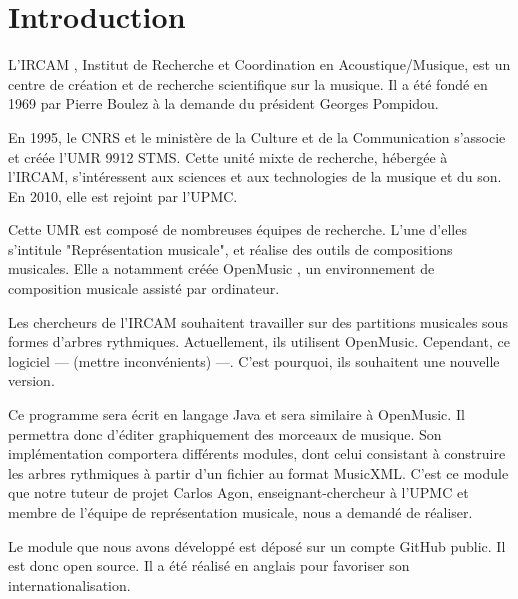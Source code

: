 \section{Introduction}


L'IRCAM \cite{ircam}, Institut de Recherche et Coordination en Acoustique/Musique, est un centre de création et de recherche scientifique sur la musique. Il a été fondé en 1969 par Pierre Boulez à la demande du président Georges Pompidou. 

\par
En 1995, le CNRS et le ministère de la Culture et de la Communication s'associe et créée l'UMR 9912 STMS. Cette unité mixte de recherche, hébergée à l'IRCAM, s'intéressent aux sciences et aux technologies de la musique et du son. En 2010, elle est rejoint par l'UPMC.

\par
Cette UMR est composé de nombreuses équipes de recherche. L'une d'elles s'intitule "Représentation musicale", et réalise des outils de compositions musicales. Elle a notamment créée OpenMusic \cite{openmusic}, un environnement de composition musicale assisté par ordinateur.

\par
Les chercheurs de l'IRCAM souhaitent travailler sur des partitions musicales sous formes d'arbres rythmiques. Actuellement, ils utilisent OpenMusic. Cependant, ce logiciel --- (mettre inconvénients) ---. C'est pourquoi, ils souhaitent une nouvelle version. 

\par
Ce programme sera écrit en langage Java et sera similaire à OpenMusic. Il permettra donc d'éditer graphiquement des morceaux de musique. Son implémentation comportera différents modules, dont celui consistant à construire les arbres rythmiques à partir d'un fichier au format MusicXML. C'est ce module que notre tuteur de projet Carlos Agon, enseignant-chercheur à l'UPMC et membre de l'équipe de représentation musicale, nous a demandé de réaliser.

\par
Le module que nous avons développé est déposé sur un compte GitHub \cite{github_pstl} public. Il est donc open source. Il a été réalisé en anglais pour favoriser son internationalisation.
